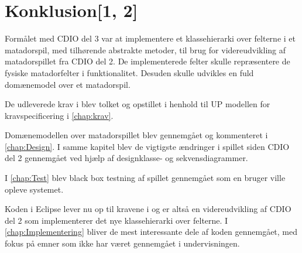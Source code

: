 \chapter{Konklusion[1, 2]}\label{chap:Konklusion}
Formålet med CDIO del 3 var at implementere et klassehierarki over felterne i et matadorspil, med tilhørende abstrakte metoder, til brug for videreudvikling af matadorspillet fra CDIO del 2. De implementerede felter skulle repræsentere de fysiske matadorfelter i funktionalitet. Desuden skulle udvikles en fuld domænemodel over et matadorspil.

De udleverede krav i \cite{CDIOdel3} blev tolket og opstillet i henhold til UP modellen for kravspecificering i \vref{chap:krav}.

Domænemodellen over matadorspillet blev gennemgået og kommenteret i \vref{chap:Design}. I samme kapitel blev de vigtigste ændringer i spillet siden CDIO del 2 gennemgået ved hjælp af designklasse- og sekvensdiagrammer.

I \vref{chap:Test} blev black box testning af spillet gennemgået som en bruger ville opleve systemet.

Koden i Eclipse lever nu op til kravene i \cite{CDIOdel3} og er altså en videreudvikling af CDIO del 2 som implementerer det nye klassehierarki over felterne. I \vref{chap:Implementering} bliver de mest interessante dele af koden gennemgået, med fokus på emner som ikke har været gennemgået i undervisningen.